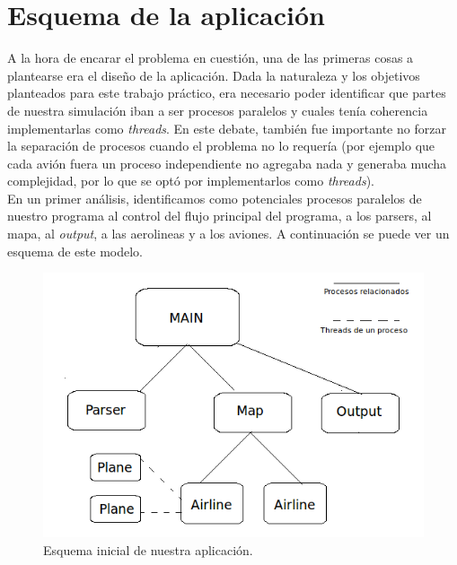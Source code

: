 \documentclass[a4paper,10pt]{article}
\begin{document}
\newpage
\section{Esquema de la aplicación}

A la hora de encarar el problema en cuestión, una de las primeras cosas a plantearse era el diseño de la aplicación. Dada la naturaleza y los objetivos planteados para este
 trabajo práctico, era necesario poder identificar que partes de nuestra simulación iban a ser procesos paralelos y cuales tenía coherencia implementarlas como \textit{threads}.
  En este debate, también fue importante no forzar la separación de procesos cuando el problema no lo requería (por ejemplo que cada avión fuera un proceso independiente no agregaba 
  nada y generaba mucha complejidad, por lo que se optó por implementarlos como \textit{threads}).\\ 

En un primer análisis, identificamos como potenciales procesos paralelos de nuestro programa al control del flujo principal del programa, a los parsers, al mapa, al \textit{output},
 a las aerolineas y
 a los aviones. A continuación se puede ver un esquema de este modelo.\\

\begin{figure}[H]
\begin{center}
 \includegraphics[scale=0.6]{./images/Diagrama_simulacion_2.png}
 \caption{Esquema inicial de nuestra aplicación.}
\end{center}
\end{figure}
\end{document}
